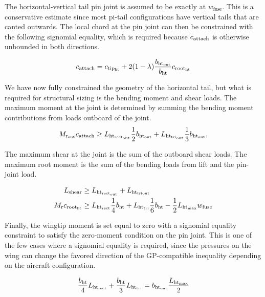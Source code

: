The horizontal-vertical tail pin joint is assumed to be exactly at $w_{\textrm{fuse}}$. 
This is a conservative estimate since most pi-tail configurations have vertical
tails that are canted outwards. The local chord at the pin joint can then be constrained with
the following signomial equality, which is required because $c_{\rm{attach}}$ is otherwise
unbounded in both directions.
 
\begin{equation}
    c_{\rm{attach}} = c_{\rm{tip_{ht}}} + 2 (1-\lambda) \frac{b_{\rm{ht_{out}}}}{b_{\rm{ht}}}
            c_{\rm{root_{ht}}}
\end{equation}

We have now fully constrained the geometry of the horizontal tail, but
what is required for structural sizing is the bending moment and shear loads.
The maximum moment at the joint is determined by summing the bending moment 
contributions from loads outboard of the joint. 
\begin{equation}
M_{\rm{r}_{\rm{out}}} c_{\rm{attach}} \geq 
                    L_{\rm{ht}_{\rm{rect}_{\rm{out}}}} \frac{1}{2}b_{\rm{ht}_{\rm{out}}} + 
L_{\rm{ht}_{tri_{\rm{out}}}} \frac{1}{3}b_{\rm{ht}_{\rm{out}}},
\end{equation}
 
The maximum shear at the joint is the sum of the outboard shear loads. The 
maximum root moment is the sum of the bending loads from lift and the pin-joint 
load. 
 
\begin{align}
L_{\rm{shear}} &\geq L_{\rm{ht}_{\rm{rect}_{\rm{out}}}} + L_{\rm{ht}_{tri{\rm{out}}}}\\
M_{\rm{r}} c_{\rm{root}_{\rm{ht}}} &\geq L_{\rm{ht}_{\rm{rect}}} \frac{1}{4}b_{\rm{ht}} + L_{\rm{ht}_{\rm{\rm{tri}}}} 
\frac{1}{6}b_{\rm{ht}}  - \frac{1}{2}L_{\rm{ht}_{\rm{max}}} w_{\textrm{fuse}} 
\end{align}

Finally, the wingtip moment is set equal to zero with a signomial equality 
constraint to satisfy the zero-moment condition on the pin joint. This is one
of the few cases where a signomial equality is required, since the pressures
on the wing can change the favored direction of the GP-compatible inequality depending on
the aircraft configuration.

\begin{equation}
    \frac{b_{\rm{ht}}}{4} L_{\rm{ht}_{\rm{rect}}} + \frac{b_{\rm{ht}}}{3} L_{\rm{ht}_{\rm{\rm{tri}}}} = b_{\rm{ht}_{\rm{out}}} 
\frac{L_{\rm{ht}_{\rm{max}}}}{2}
\end{equation}

